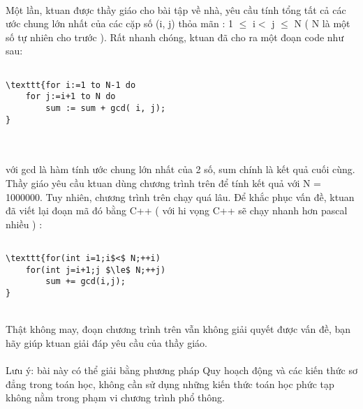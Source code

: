  

Một lần, ktuan được thầy giáo cho bài tập về nhà, yêu cầu tính tổng tất cả các ước chung lớn nhất của các cặp số (i, j) thỏa mãn : 1 $\le$ i$<$ j $\le$ N ( N là một số tự nhiên cho trước ). Rất nhanh chóng, ktuan đã cho ra một đoạn code như sau:
\begin{verbatim}

\texttt{for i:=1 to N-1 do
    for j:=i+1 to N do
        sum := sum + gcd( i, j);
}\end{verbatim}


\\
\\với gcd là hàm tính ước chung lớn nhất của 2 số, sum chính là kết quả cuối cùng.
\\Thầy giáo yêu cầu ktuan dùng chương trình trên để tính kết quả với N = 1000000. Tuy nhiên, chương trình trên chạy quá lâu. Để khắc phục vấn đề, ktuan đã viết lại đoạn mã đó bằng C++ ( với hi vọng C++ sẽ chạy nhanh hơn pascal nhiều ) :
\begin{verbatim}

\texttt{for(int i=1;i$<$ N;++i)
    for(int j=i+1;j $\le$ N;++j)
        sum += gcd(i,j);
}\end{verbatim}


\\Thật không may, đoạn chương trình trên vẫn không giải quyết được vấn đề, bạn hãy giúp ktuan giải đáp yêu cầu của thầy giáo.
\\
\\Lưu ý: bài này có thể giải bằng phương pháp Quy hoạch động và các kiến thức sơ đẳng trong toán học, không cần sử dụng những kiến thức toán học phức tạp không nằm trong phạm vi chương trình phổ thông.